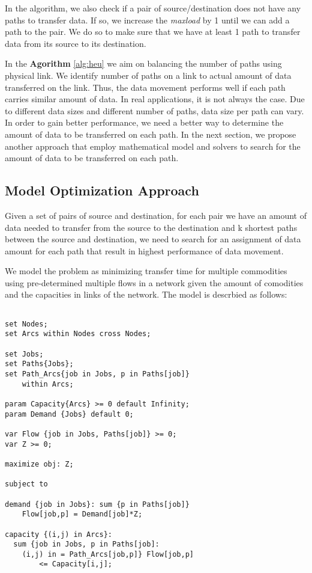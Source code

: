 In the algorithm, we also check if a pair of source/destination does not have any paths to transfer data. If so, we increase the \textit{maxload} by 1 until we can add a path to the pair. We do so to make sure that we have at least 1 path to transfer data from its source to its destination.

In the \textbf{Agorithm} \ref{alg:heu} we aim on balancing the number of paths using physical link. We identify number of paths on a link to actual amount of data transferred on the link.  Thus, the data movement performs well if each path carries similar amount of data. In real applications, it is not always the case. Due to different data sizes and different number of paths, data size per path can vary. In order to gain better performance, we need a better way to determine the amount of data to be transferred on each path. In the next section, we propose another approach that employ mathematical model and solvers to search for the amount of data to be transferred on each path. 

\subsection{Model Optimization Approach}

Given a set of pairs of source and destination, for each pair we have an amount of data needed to transfer from the source to the destination and k shortest paths between the source and destination, we need to search for an assignment of data amount for each path that result in highest performance of data movement.

We model the problem as minimizing transfer time for multiple commodities using pre-determined multiple flows in a network given the amount of comodities and the capacities in links of the network. The model is descrbied as follows:

\begingroup
\fontsize{9pt}{9pt}\selectfont

\begin{verbatim}

set Nodes;
set Arcs within Nodes cross Nodes;

set Jobs;
set Paths{Jobs};
set Path_Arcs{job in Jobs, p in Paths[job]} 
    within Arcs;

param Capacity{Arcs} >= 0 default Infinity;
param Demand {Jobs} default 0;

var Flow {job in Jobs, Paths[job]} >= 0;
var Z >= 0;

maximize obj: Z;

subject to

demand {job in Jobs}: sum {p in Paths[job]} 
	Flow[job,p] = Demand[job]*Z;

capacity {(i,j) in Arcs}:
  sum {job in Jobs, p in Paths[job]: 
    (i,j) in = Path_Arcs[job,p]} Flow[job,p] 
		<= Capacity[i,j];

\end{verbatim}

